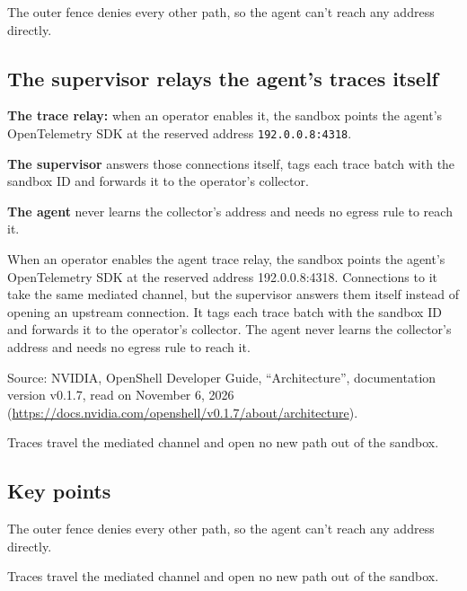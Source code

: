 \begin{takeaway}The outer fence denies every other path, so the agent can't reach any address directly.\end{takeaway}

\subsection{The supervisor relays the agent's traces itself}
\label{sec:it-os-3-2}

\bi
\item \textbf{The trace relay:} when an operator enables it, the sandbox points the agent's OpenTelemetry SDK at the reserved address \texttt{192.0.0.8:4318}.
\item \textbf{The supervisor} answers those connections itself, tags each trace batch with the sandbox ID and forwards it to the operator's collector.
\item \textbf{The agent} never learns the collector's address and needs no egress rule to reach it.
\ei

When an operator enables the agent trace relay, the sandbox points the agent's OpenTelemetry SDK at the reserved address 192.0.0.8:4318. Connections to it take the same mediated channel, but the supervisor answers them itself instead of opening an upstream connection. It tags each trace batch with the sandbox ID and forwards it to the operator's collector. The agent never learns the collector's address and needs no egress rule to reach it.

Source: NVIDIA, OpenShell Developer Guide, ``Architecture'', documentation version v0.1.7, read on November 6, 2026 (\url{https://docs.nvidia.com/openshell/v0.1.7/about/architecture}).

\begin{takeaway}Traces travel the mediated channel and open no new path out of the sandbox.\end{takeaway}

\subsection*{Key points}
\bi
\item The outer fence denies every other path, so the agent can't reach any address directly.
\item Traces travel the mediated channel and open no new path out of the sandbox.
\ei
